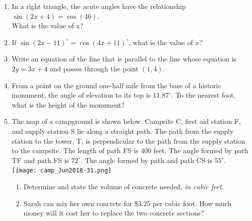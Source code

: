 \documentclass[12pt, twoside]{article}
\begin{document}
\begin{enumerate}
      \item In a right triangle, the acute angles have the relationship $\sin (2x+4)=\cos(46)$.\\[0.25cm]
        What is the value of x? \vspace{3cm}

      \item If $\sin (2x-11)^\circ = \cos(4x+11)^\circ$, what is the value of $x$? \vspace{3cm}


  \item Write an equation of the line that is parallel to the line whose equation is $2y=3x+4$ and passes through the point $(1,4)$.

  \item From a point on the ground one-half mile from the base of a historic monument, the angle of elevation to its top is $11.87^\circ$. To the nearest foot, what is the height of the monument?\\[1cm]
    \vspace{3cm}

  \item The map of a campground is shown below. Campsite C, first aid station F, and supply station S lie along a straight path. The path from the supply station to the tower, T, is perpendicular to the path from the supply station to the campsite. The length of path FS is 400 feet. The angle formed by path TF and path FS is $72^\circ$. The angle formed by path   and path CS is $55^\circ$.\\[0.5cm]
  \texttt{[image: camp\_Jun2018-31.png]}
    \begin{enumerate}
      \item Determine and state the volume of concrete needed, \emph{in cubic feet}. \vspace{1cm}
      \item Sarah can mix her own concrete for \$3.25 per cubic foot. How much money will it cost her to replace the two concrete sections?
  \end{enumerate} \vspace{2.5cm}


\end{enumerate}
\end{document}
